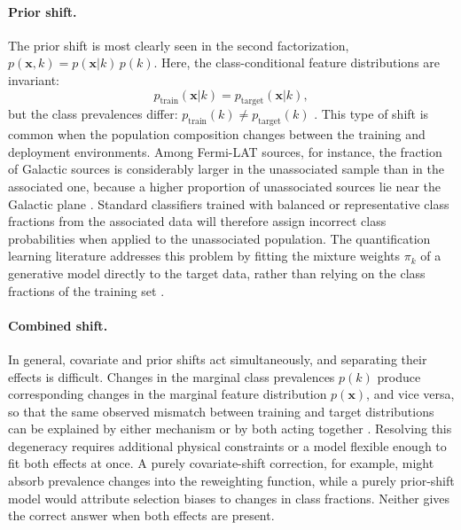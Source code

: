 \paragraph{Prior shift.}

The prior shift is most clearly seen in the second factorization, $p(\mathbf{x}, k) = p(\mathbf{x}|k)\,p(k)$.
Here, the class-conditional feature distributions are invariant:
\begin{equation}
	p_{\text{train}}(\mathbf{x}|k) = p_{\text{target}}(\mathbf{x}|k),
	\label{eq:prior_shift}
\end{equation}
but the class prevalences differ: $p_{\text{train}}(k) \neq p_{\text{target}}(k)$ \cite{MorenoTorres2012AUV}.
This type of shift is common when the population composition changes between the training and deployment environments.
Among Fermi-LAT sources, for instance, the fraction of Galactic sources is considerably larger in the unassociated sample than in the associated one, because a higher proportion of unassociated sources lie near the Galactic plane \cite{2023RASTI...2..735M}.
Standard classifiers trained with balanced or representative class fractions from the associated data will therefore assign incorrect class probabilities when applied to the unassociated population.
The quantification learning literature \cite{10.1145/3117807_Gonzalez_quantification} addresses this problem by fitting the mixture weights $\pi_k$ of a generative model directly to the target data, rather than relying on the class fractions of the training set \cite{10.1162/089976602753284446_Saerens,2024arXiv240100490M}.

\paragraph{Combined shift.}

In general, covariate and prior shifts act simultaneously, and separating their effects is difficult.
Changes in the marginal class prevalences $p(k)$ produce corresponding changes in the marginal feature distribution $p(\mathbf{x})$, and vice versa, so that the same observed mismatch between training and target distributions can be explained by either mechanism or by both acting together \cite{MorenoTorres2012AUV}.
Resolving this degeneracy requires additional physical constraints or a model flexible enough to fit both effects at once.
A purely covariate-shift correction, for example, might absorb prevalence changes into the reweighting function, while a purely prior-shift model would attribute selection biases to changes in class fractions.
Neither gives the correct answer when both effects are present.

